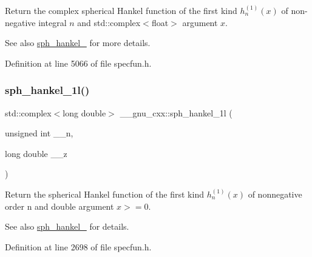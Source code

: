 Return the complex spherical Hankel function of the first kind $ h^{(1)}_n(x) $ of non-\/negative integral $ n $ and {\ttfamily std\+::complex$<$float$>$} argument $ x $.

\begin{DoxySeeAlso}{See also}
\hyperlink{group__gnu__math__spec__func_ga4424f565fb224ab88b177beb65d08305}{sph\+\_\+hankel\+\_} for more details. 
\end{DoxySeeAlso}


Definition at line 5066 of file specfun.\+h.

\mbox{\label{group__gnu__math__spec__func_ga6e77fd5cddfbd57d9120b20fc6c30e6f}} 
\subsubsection{\texorpdfstring{sph\+\_\+hankel\+\_\+1l()}{sph\_hankel\_1l()}\hspace{0.1cm}{\footnotesize\ttfamily [1/2]}}
{\footnotesize\ttfamily std\+::complex$<$long double$>$ \+\_\+\+\_\+gnu\+\_\+cxx\+::sph\+\_\+hankel\+\_\+1l (\begin{DoxyParamCaption}\item[{unsigned int}]{\+\_\+\+\_\+n,  }\item[{long double}]{\+\_\+\+\_\+z }\end{DoxyParamCaption})\hspace{0.3cm}{\ttfamily [inline]}}

Return the spherical Hankel function of the first kind $ h^{(1)}_n(x) $ of nonnegative order n and { double} argument $ x >= 0 $.

\begin{DoxySeeAlso}{See also}
\hyperlink{group__gnu__math__spec__func_ga4424f565fb224ab88b177beb65d08305}{sph\+\_\+hankel\+\_} for details. 
\end{DoxySeeAlso}


Definition at line 2698 of file specfun.\+h.

\mbox{\label{group__gnu__math__spec__func_ga3e9d889d8f2e4792e892b12b1f5948b9}} 
